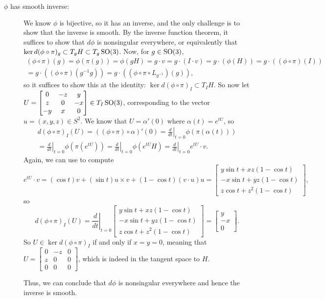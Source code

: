 \begin{example}
\begin{description}
		\item[$\phi$ has smooth inverse:] We know $\phi$ is bijective, so it has an inverse, and the only challenge is to show that the inverse is smooth. By the inverse function theorem, it suffices to show that $d\phi$ is nonsingular everywhere, or equivalently that $\ker d(\phi \circ \pi)_g \subset T_g H \subset T_g \operatorname{SO}(3)$. Now, for $g \in \operatorname{SO}(3)$,
		\begin{multline*}
			(\phi \circ \pi)(g) = \phi(\pi(g)) = \phi(gH) = g \cdot v = g \cdot (I \cdot v) = g \cdot (\phi(H)) = g \cdot((\phi \circ \pi)(I)) \\
			= g \cdot\left((\phi \circ \pi)\left(g^{-1} g\right)\right) = g \cdot \left(\left(\phi \circ \pi \circ L_{g^{-1}}\right)(g)\right),
		\end{multline*}
		so it suffices to show this at the identity: $\ker d(\phi \circ \pi)_I \subset T_I H$. So now let $U = \begin{bmatrix} 0 & -z & y \\ z & 0 & -x \\ -y & x & 0 \end{bmatrix} \in T_I \operatorname{SO}(3)$, corresponding to the vector $u = (x,y,z) \in S^2$. We know that $U = \alpha'(0)$ where $\alpha(t) = e^{tU}$, so
		\begin{multline*}
			d(\phi \circ \pi)_I (U) = ((\phi \circ \pi) \circ \alpha)'(0) = \left. \frac{d}{dt} \right|_{t=0} \phi(\pi(\alpha(t))) \\
			= \left. \frac{d}{dt}\right|_{t=0} \phi(\pi(e^{tU})) = \left. \frac{d}{dt}\right|_{t=0} \phi(e^{tU}H) = \left. \frac{d}{dt}\right|_{t=0} e^{tU}\cdot v.
		\end{multline*}
		Again, we can use  to compute
		\[
			e^{tU}\cdot v = (\cos t) v + (\sin t) u \times v + (1-\cos t)(v \cdot u)u = \begin{bmatrix} y \sin t + xz(1-\cos t) \\ -x \sin t + yz(1-\cos t) \\ z \cos t + z^2(1-\cos t) \end{bmatrix},
		\]
		so
		\[
			d(\phi \circ \pi)_I (U) = \left. \frac{d}{dt}\right|_{t=0} \begin{bmatrix} y \sin t + xz(1-\cos t) \\ -x \sin t + yz(1-\cos t) \\ z \cos t + z^2(1-\cos t) \end{bmatrix} = \begin{bmatrix} y \\ -x \\ 0 \end{bmatrix}.
		\]
		So $U \in \ker d(\phi \circ \pi)_I$ if and only if $x=y=0$, meaning that $U = \begin{bmatrix} 0 & -z & 0 \\ z & 0 & 0 \\ 0 & 0 & 0 \end{bmatrix}$, which is indeed in the tangent space to $H$. 
		
		Thus, we can conclude that $d\phi$ is nonsingular everywhere and hence the inverse is smooth.
	\end{description}
\end{example}


